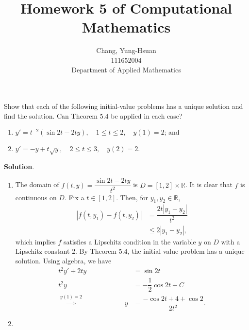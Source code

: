 \documentclass[11pt]{article}
\title{Homework 5 of Computational Mathematics}
\author{Chang, Yung-Hsuan\\111652004\\Department of Applied Mathematics}
\theoremstyle{break}
\numberwithin{equation}{theorem}
\begin{document}
\maketitle
\thispagestyle{empty}
\newpage
{}

\begin{problem}\label{problem 1} %
    Show that each of the following initial-value problems has a unique solution and find the solution. Can Theorem 5.4 be applied in each case?
    \begin{enumerate}
        \item $y'=t^{-2}(\sin2t-2ty), \quad 1\leq t\leq 2, \quad y(1)=2$; and
        \item $y'=-y+t\sqrt{y}, \quad 2\leq t\leq 3, \quad y(2)=2$.
    \end{enumerate}
\end{problem}
\textbf{Solution}. 
\begin{enumerate}
    \item The domain of $f(t, y)=\dfrac{\sin 2t-2ty}{t^2}$ is $D=[1, 2]\times\mathbb{R}$. It is clear that $f$ is continuous on $D$. Fix a $t\in[1, 2]$. Then, for $y_1, y_2\in\mathbb{R}$, \begin{align*}
        |f(t, y_1)-f(t, y_2)|&=\dfrac{2t|y_1-y_2|}{t^2}\\
        &\leq2|y_1-y_2|,
    \end{align*}
    which implies $f$ satisfies a Lipschitz condition in the variable $y$ on $D$ with a Lipschitz constant $2$. By Theorem 5.4, the initial-value problem has a unique solution. Using algebra, we have \begin{align*}
        t^2y'+2ty&=\sin 2t\\
        t^2y&=-\dfrac{1}{2}\cos2t+C\\
        \overset{y(1)=2}{\implies}\qquad\qquad\quad\quad y&=\dfrac{-\cos2t+4+\cos2}{2t^2}.
    \end{align*}
    \item 
\end{enumerate}
\end{document}
